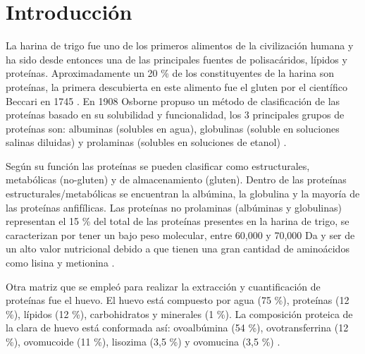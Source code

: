\documentclass[fleqn,10pt]{SelfArx}
\begin{document}
\flushbottom %

\maketitle %

\thispagestyle{empty} %




\section*{Introducci\'on} %
La harina de trigo fue uno de los primeros alimentos de la civilización humana y ha sido desde entonces una de las principales fuentes de polisacáridos, lípidos y proteínas. Aproximadamente un 20 \% de los constituyentes de la harina son proteínas, la primera descubierta en este alimento fue el gluten por el científico Beccari en 1745 \cite{carpenter1994protein}. En 1908 Osborne propuso un método de clasificación de las proteínas basado en su solubilidad y funcionalidad, los 3 principales grupos de proteínas son: albuminas (solubles en agua), globulinas (soluble en soluciones salinas diluidas) y prolaminas (solubles en soluciones de etanol) \cite{shewry2002cereal}.

Según su función las proteínas se pueden clasificar como estructurales, metabólicas (no-gluten) y de almacenamiento (gluten). Dentro de las proteínas estructurales/metabólicas se encuentran la albúmina, la globulina y la mayoría de las proteínas anfifílicas. Las proteínas no prolaminas (albúminas y globulinas) representan el 15 \% del total de las proteínas presentes en la harina de trigo, se caracterizan por tener un bajo peso molecular, entre 60,000 y 70,000 Da y ser de un alto valor nutricional debido a que tienen una gran cantidad de aminoácidos como lisina y metionina \cite{bakery}.

Otra matriz que se empleó para realizar la extracción y cuantificación de proteínas fue el huevo. El huevo está compuesto por agua (75 \%), proteínas (12 \%), lípidos (12 \%), carbohidratos y minerales (1 \%). La composición proteica de la clara de huevo está conformada así: ovoalbúmina (54 \%), ovotransferrina (12 \%), ovomucoide (11 \%), lisozima (3,5 \%) y ovomucina (3,5 \%) \cite{abeyrathne2013egg}.
\end{document}
